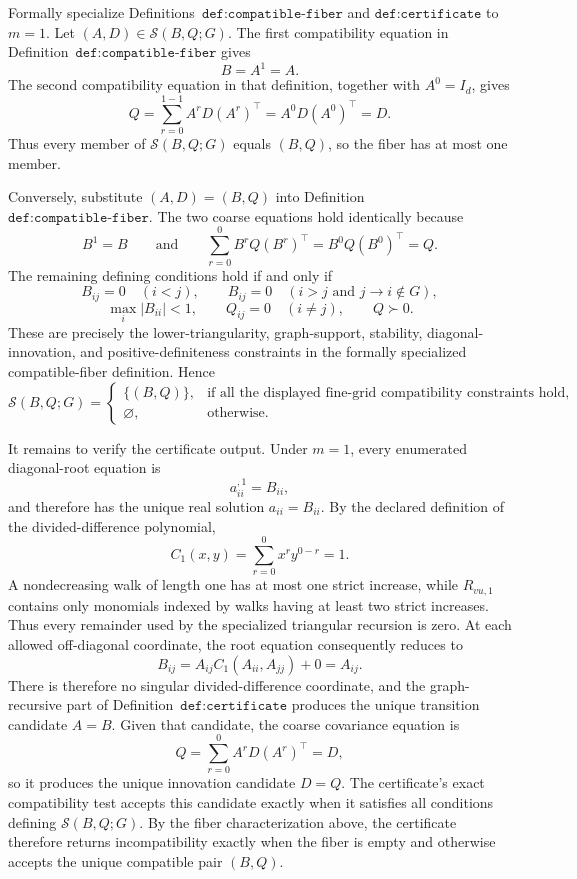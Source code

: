 Formally specialize Definitions~\(\texttt{def:compatible-fiber}\) and \(\texttt{def:certificate}\) to \(m=1\). Let \((A,D)\in\mathcal S(B,Q;G)\). The first compatibility equation in Definition~\(\texttt{def:compatible-fiber}\) gives
\[
B=A^1=A.
\]
The second compatibility equation in that definition, together with \(A^0=I_d\), gives
\[
Q=\sum_{r=0}^{1-1}A^rD(A^r)^\top
  =A^0D(A^0)^\top
  =D.
\]
Thus every member of \(\mathcal S(B,Q;G)\) equals \((B,Q)\), so the fiber has at most one member.

Conversely, substitute \((A,D)=(B,Q)\) into Definition~\(\texttt{def:compatible-fiber}\). The two coarse equations hold identically because
\[
B^1=B
\qquad\text{and}\qquad
\sum_{r=0}^{0}B^rQ(B^r)^\top=B^0Q(B^0)^\top=Q.
\]
The remaining defining conditions hold if and only if
\[
B_{ij}=0\quad(i<j),
\qquad
B_{ij}=0\quad(i>j\text{ and }j\to i\notin G),
\]
\[
\max_i|B_{ii}|<1,
\qquad
Q_{ij}=0\quad(i\ne j),
\qquad
Q\succ0.
\]
These are precisely the lower-triangularity, graph-support, stability, diagonal-innovation, and positive-definiteness constraints in the formally specialized compatible-fiber definition. Hence
\[
\mathcal S(B,Q;G)=
\begin{cases}
\{(B,Q)\},&\text{if all the displayed fine-grid compatibility constraints hold},\\
\varnothing,&\text{otherwise}.
\end{cases}
\]

It remains to verify the certificate output. Under \(m=1\), every enumerated diagonal-root equation is
\[
a_{ii}^{,1}=B_{ii},
\]
and therefore has the unique real solution \(a_{ii}=B_{ii}\). By the declared definition of the divided-difference polynomial,
\[
C_1(x,y)=\sum_{r=0}^{0}x^r y^{0-r}=1.
\]
A nondecreasing walk of length one has at most one strict increase, while \(R_{vu,1}\) contains only monomials indexed by walks having at least two strict increases. Thus every remainder used by the specialized triangular recursion is zero. At each allowed off-diagonal coordinate, the root equation consequently reduces to
\[
B_{ij}=A_{ij}C_1(A_{ii},A_{jj})+0=A_{ij}.
\]
There is therefore no singular divided-difference coordinate, and the graph-recursive part of Definition~\(\texttt{def:certificate}\) produces the unique transition candidate \(A=B\). Given that candidate, the coarse covariance equation is
\[
Q=\sum_{r=0}^{0}A^rD(A^r)^\top=D,
\]
so it produces the unique innovation candidate \(D=Q\). The certificate's exact compatibility test accepts this candidate exactly when it satisfies all conditions defining \(\mathcal S(B,Q;G)\). By the fiber characterization above, the certificate therefore returns incompatibility exactly when the fiber is empty and otherwise accepts the unique compatible pair \((B,Q)\).

